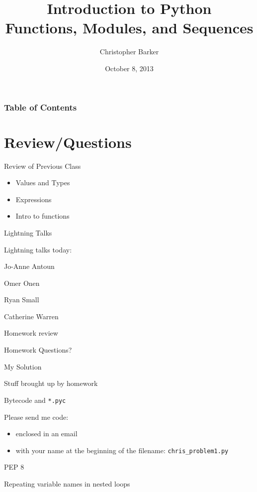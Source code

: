 \documentclass{beamer}
\title[Intro to Python: Week 1]{Introduction  to Python\\ Functions, Modules, and Sequences}
\author{Christopher Barker}
\institute{UW Continuing Education}
\date{October 8, 2013}
\begin{document}
\begin{frame}
  \titlepage
\end{frame}

\begin{frame}
\frametitle{Table of Contents}
  \tableofcontents
\end{frame}


\section{Review/Questions}

\begin{frame}[fragile]{Review of Previous Class}

\begin{itemize}
  \item Values and Types
  \item Expressions
  \item Intro to functions
\end{itemize}

\end{frame}


\begin{frame}[fragile]{Lightning Talks}

\vfill
{\LARGE Lightning talks today:}

\vfill
{\Large
Jo-Anne Antoun 

\vfill
Omer Onen 

\vfill
Ryan Small

\vfill
Catherine Warren 
}
\vfill

\end{frame}


\begin{frame}[fragile]{Homework review}

  \vfill
  {\Large Homework Questions? }

  \vfill
  {\Large My Solution}

  \vfill

\end{frame}

\begin{frame}[fragile]{Stuff brought up by homework}

  \vfill
  {\Large Bytecode and \verb|*.pyc| }

  \vfill
  {\Large Please send me code:
    \begin{itemize}
      \item{enclosed in an email}
      \item{with your name at the beginning of the filename: \verb|chris_problem1.py|}
    \end{itemize}
  }

  \vfill
  {\Large PEP 8}

  \vfill
  {\Large Repeating variable names in nested loops}


\end{frame}
\end{document}
